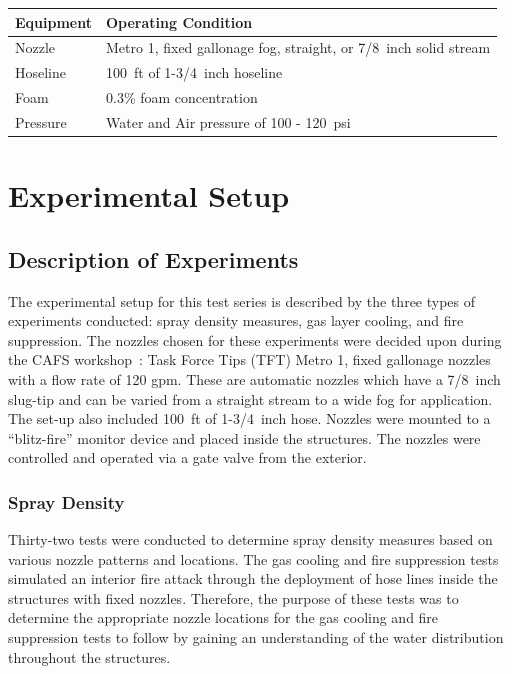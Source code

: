 \documentclass[12pt,oneside]{book}
\begin{document}
\begin{table}[!ht]
\centering
{}\label{tab:op_condition}
\begin{tabular}{ll}
\toprule[1.5pt]
Equipment    &   Operating Condition \\
\midrule
Nozzle       & Metro 1, fixed gallonage fog, straight, or 7/8~inch solid stream \\
Hoseline     & 100~ft of 1-3/4~inch hoseline \\
Foam         & 0.3\% foam concentration \\
Pressure     & Water and Air pressure of 100 - 120~psi \\
\bottomrule[1.25pt]
\end{tabular}\par
\end{table}


\chapter{Experimental Setup}

\section{Description of Experiments}
\label{sec:desc_experiments}
The experimental setup for this test series is described by the three types of experiments conducted: spray density measures, gas layer cooling, and fire suppression. The nozzles chosen for these experiments were decided upon during the CAFS workshop~\cite{Grant:2011}: Task Force Tips (TFT) Metro 1, fixed gallonage nozzles with a flow rate of 120 gpm. These are automatic nozzles which have a 7/8~inch slug-tip and can be varied from a straight stream to a wide fog for application. The set-up also included 100~ft of 1-3/4~inch hose. Nozzles were mounted to a ``blitz-fire'' monitor device and placed inside the structures. The nozzles were controlled and operated via a gate valve from the exterior.

\subsection{Spray Density}
\label{sec:desc_Spray_Density}

Thirty-two tests were conducted to determine spray density measures based on various nozzle patterns and locations. The gas cooling and fire suppression tests simulated an interior fire attack through the deployment of hose lines inside the structures with fixed nozzles. Therefore, the purpose of these tests was to determine the appropriate nozzle locations for the gas cooling and fire suppression tests to follow by gaining an understanding of the water distribution throughout the structures.
\end{document}
